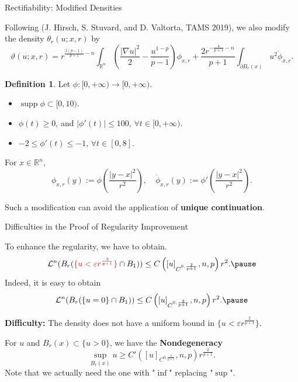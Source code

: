\documentclass[11pt]{beamer}
\newcommand{\pa}{\partial}
\newcommand{\va}{\varepsilon}
\newcommand{\vt}{\vartheta}
\newcommand{\cL}{\mathcal{L}}
\newcommand{\R}{\mathbb{R}}
\newcommand{\ift}{\infty}
\newcommand{\f}{\frac}
\newcommand{\na}{\nabla}
\DeclareMathOperator{\supp}{supp}
\def\({\left(}                 \def\){\right)}
\theoremstyle{plain}
\theoremstyle{definition}
\newtheorem{defn}[thm]{Definition}
\begin{document}
\begin{frame}{Rectifiability: Modified Densities}

Following (J. Hirsch, S. Stuvard, and D. Valtorta, TAMS 2019), we also modify the density $ \theta_r(u;x,r) $ by
$$
\vt(u;x,r)=r^{\f{2(p-1)}{p+1}-n}\int_{\R^n}\(\f{|\na u|^2}{2}-\f{u^{1-p}}{p-1}\)\phi_{x,r}+\f{2r^{-\f{4}{p+1}-n}}{p+1}\int_{\pa B_r(x)}u^2\dot{\phi}_{x,r}.
$$

\begin{defn}
Let $ \phi:[0,+\ift)\to[0,+\ift) $.
\begin{itemize}
\item $ \supp\phi\subset[0,10) $.
\item $ \phi(t)\geq 0 $, and $ |\phi'(t)|\leq 100 $, $ \forall t\in[0,+\ift) $.
\item $ -2\leq\phi'(t)\leq -1 $, $ \forall t\in[0,8] $.
\end{itemize}
For $ x\in\R^n $,
$$
\phi_{x,r}(y):=\phi\(\f{|y-x|^2}{r^2}\),\quad\dot{\phi}_{x,r}(y):=\phi'\(\f{|y-x|^2}{r^2}\).
$$
\end{defn}\pause

Such a modification can avoid the application of \textbf{unique continuation}.

\end{frame}


\begin{frame}{Difficulties in the Proof of Regularity Improvement}

To enhance the regularity, we have to obtain.
$$
\cL^n(B_r(\textcolor{red}{\{u<\va r^{\f{2}{p+1}}\}}\cap B_1))\leq C\([u]_{C^{0,\f{2}{p+1}}},n,p\)r^2.\pause
$$
Indeed, it is easy to obtain
$$
\cL^n(B_r(\{u=0\}\cap B_1))\leq C\([u]_{C^{0,\f{2}{p+1}}},n,p\)r^2.\pause
$$



\textbf{Difficulty:} The density does not have a uniform bound in $ \{u<\va r^{\f{2}{p+1}}\} $.

\vspace{1em}

For $ u $ and $ B_r(x)\subset\{u>0\} $, we have the \textbf{Nondegeneracy}
$$
\sup_{B_r(x)}u\geq C'\([u]_{C^{0,\f{2}{p+1}}},n,p\)r^{\f{2}{p+1}}.
$$
Note that we actually need the one with "$ \inf $" replacing "$ \sup $".

\end{frame}
\end{document}
